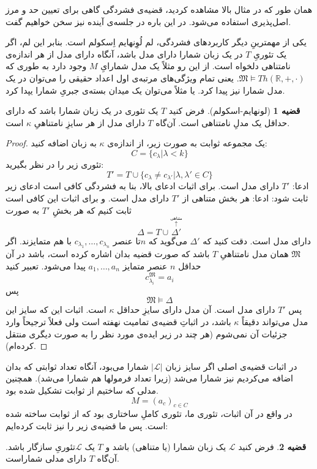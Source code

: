 \documentclass[12pt,a4paper]{article}
\theoremstyle{definition}
\newtheorem{thm}{قضیه}
\begin{document}
همان طور که در مثال بالا مشاهده کردید، قضیه‌ی فشردگی گاهی برای تعیین حد و مرز اصل‌پذیری استفاده می‌شود. در این باره در جلسه‌ی آینده نیز سخن خواهیم گفت.
\par 
یکی از مهمترینِ دیگر کاربردهای فشردگی، لم لُوِنهایم اِسکولم است. بنابر این لم، اگر یک تئوریِ
$T$
در یک زبان شمارا دارای مدل باشد، آنگاه دارای مدل از هر اندازه‌ی نامتناهی دلخواه است. از این رو مثلاً یک مدل شمارایِ
$M$
وجود دارد به طوری که
$\mathfrak{M}\models Th(\mathbb{R},+,\cdot)$.
یعنی تمام ویژگی‌های مرتبه‌ی اول اعداد حقیقی را می‌توان در یک مدل شمارا نیز پیدا کرد. یا مثلاً می‌توان یک میدان بسته‌ی جبریِ شمارا یپدا کرد.
	\begin{thm}[لونهایم-اسکولم]
		فرض کنید 
		$ T $
		یک تئوری در یک زبان شمارا باشد که دارای حداقل یک مدلِ نامتناهی است. آن‌گاه 
		$ T $
		دارای مدل از هر سایزِ نامتناهیِ
$\kappa$
		است.
	\end{thm}
	\begin{proof}
یک مجموعه ثوابت به صورت زیر، از اندازه‌ی
$\kappa$
به زبان اضافه کنید:
		\[ C = \{ c_\lambda |\lambda < k \} \]
		تئوری زیر را در نظر بگیرید:
		\[ T' = T \cup \{ c_\lambda \neq c_{\lambda'}| \lambda,\lambda' \in C \} \]
		ادعا: 
		$ T' $
		دارای مدل است.
برای اثبات ادعای بالا، بنا به فشردگی کافی است ادعای زیر ثابت شود:
\newline 
		ادعا:
		هر بخش متناهی از 
		$ T' $
		دارای مدل است.
		\newline
	و برای اثبات این کافی است ثابت کنیم که هر بخشِ
	$T'$
	به صورت
		\[ \Delta = T\cup \stackrel{\stackrel{\text{متناهی}}{\uparrow}}{\Delta'} \]
	دارای مدل است. دقت کنید که
		$ \Delta' $
		می‌گوید که 
		$ n $تا
		عنصر 
		$ c_{\lambda_1},\ldots,c_{\lambda_n} $
		با هم متمایزند. اگر 
		$ \mathfrak{M} $
همان مدل نامتناهیِ
$T$
باشد که صورت قضیه بدان اشاره کرده است،
		باشد در آن حداقل 
		$ n $
		عنصر متمایز 
		$ a_1, \ldots , a_n $
		پیدا می‌شود. تعبیر کنید 
		\[ c_{\lambda_i}^\mathfrak{M} =a_i \]
		پس 
		\[ \mathfrak{M} \models \Delta \]
		پس 
		$ T' $
		دارای مدل است. آن مدل دارای سایزِ حداقل 
		$ \kappa $
		است. اثبات این که سایز این مدل می‌تواند دقیقاً
		$\kappa$
		باشد، در اثباتِ قضیه‌ی تمامیت نهفته است ولی فعلاً ترجیحاً وارد جزئیات آن نمی‌شوم (هر چند در زیر ایده‌ی مورد نظر را به صورت دیگری منتقل کرده‌ام).
			\end{proof}
			در اثبات قضیه‌ی اصلی اگر سایز زبان
			$ |\mathcal{L}| $
	شمارا می‌بود،
آنگاه تعداد ثوابتی که بدان اضافه می‌کردیم نیز شمارا می‌شد (زیرا تعداد فرمولها هم شمارا می‌شد).
همچنین مدلی که ساختیم از ثوابت تشکیل شده بود.
			\[ M=(a_c)_{c\in C} \]
در واقع در آن اثبات، تئوری ما، تئوری کاملِ ساختاری بود که از ثوابت ساخته شده است.	پس ما قضیه‌ی زیر را نیز ثابت کرده‌ایم:
	\begin{thm}
		فرض کنید 
		$ \mathcal{L} $
		یک زبان شمارا (یا متناهی) باشد و 
		$ T $
		یک 
		$ \mathcal{L} $تئوریِ
		سازگار باشد. آن‌گاه 
		$ T $
		دارای مدلی شماراست.
	\end{thm}
\end{document}
